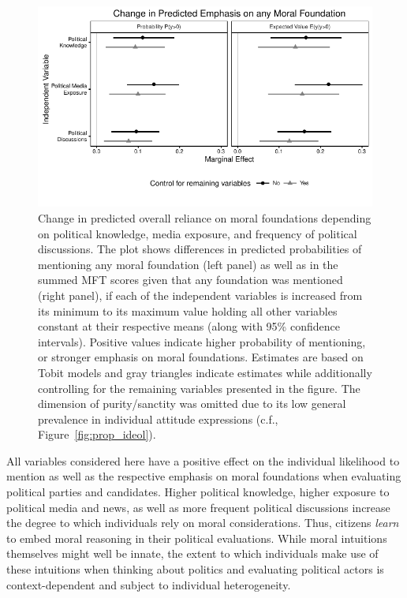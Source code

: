 \documentclass[12pt]{article}
\begin{document}
\begin{figure}[h]\centering
\includegraphics{../calc/fig/tobit_learn.pdf}
\caption{Change in predicted overall reliance on moral foundations depending on political knowledge, media exposure, and frequency of political discussions. The plot shows differences in predicted probabilities of mentioning any moral foundation (left panel) as well as in the summed MFT scores given that any foundation was mentioned (right panel), if each of the independent variables is increased from its minimum to its maximum value holding all other variables constant at their respective means (along with 95\% confidence intervals). Positive values indicate higher probability of mentioning, or stronger emphasis on moral foundations. Estimates are based on Tobit models and gray triangles indicate estimates while additionally controlling for the remaining variables presented in the figure. The dimension of purity/sanctity was omitted due to its low general prevalence in individual attitude expressions (c.f., Figure~\ref{fig:prop_ideol}). %
}\label{fig:tobit_learn}
\end{figure}

All variables considered here have a positive effect on the individual likelihood to mention as well as the respective emphasis on moral foundations when evaluating political parties and candidates. Higher political knowledge, higher exposure to political media and news, as well as more frequent political discussions increase the degree to which individuals rely on moral considerations. Thus, citizens \textit{learn} to embed moral reasoning in their political evaluations. While moral intuitions themselves might well be innate, the extent to which individuals make use of these intuitions when thinking about politics and evaluating political actors is context-dependent and subject to individual heterogeneity.
\end{document}

